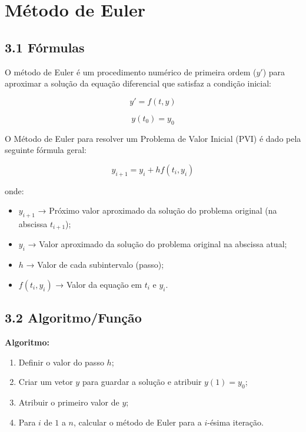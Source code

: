 \chapter{Método de Euler}

\section*{3.1 Fórmulas}

O método de Euler é um procedimento numérico de primeira ordem ($y'$) para aproximar a solução da equação diferencial que satisfaz a condição inicial:

\begin{equation}
y' = f(t, y)
\end{equation}

\begin{equation}
y(t_0) = y_0
\end{equation}

O Método de Euler para resolver um Problema de Valor Inicial (PVI) é dado pela seguinte fórmula geral:

\begin{equation}
y_{i+1} = y_i + h f(t_i, y_i)
\end{equation}

onde:
\begin{itemize}
    \item $y_{i+1}$ → Próximo valor aproximado da solução do problema original (na abscissa $t_{i+1}$);
    \item $y_i$ → Valor aproximado da solução do problema original na abscissa atual;
    \item $h$ → Valor de cada subintervalo (passo);
    \item $f(t_i , y_i)$ → Valor da equação em $t_i$ e $y_i$.
\end{itemize}

\section*{3.2 Algoritmo/Função}

\textbf{Algoritmo:}
\begin{enumerate}
    \item Definir o valor do passo $h$;
    \item Criar um vetor $y$ para guardar a solução e atribuir $y(1) = y_0$;
    \item Atribuir o primeiro valor de $y$;
    \item Para $i$ de $1$ a $n$, calcular o método de Euler para a $i$-ésima iteração.
\end{enumerate}
